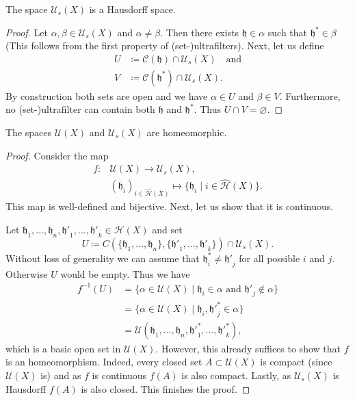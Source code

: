 \begin{lemma}
  The space \(\mathcal{U}_s(X)\) is a Hausdorff space.
\end{lemma}

\begin{proof}
  Let \(\alpha, \beta \in \mathcal{U}_s(X)\) and \(\alpha \neq \beta\). Then there exists \(\mathfrak{h} \in \alpha\) such that \(\mathfrak{h}^\ast \in \beta\) (This follows from the first property of (set-)ultrafilters). Next, let us define
  \begin{align*}
    U & \coloneqq \mathcal{C}(\mathfrak{h}) \cap \mathcal{U}_s(X)\quad \text{and}\\
    V & \coloneqq \mathcal{C}(\mathfrak{h}^\ast) \cap \mathcal{U}_s(X).
  \end{align*}
  By construction both sets are open and we have \(\alpha \in U\) and \(\beta \in V\). Furthermore, no (set-)ultrafilter can contain both \(\mathfrak{h}\) and \(\mathfrak{h}^\ast\). Thus \(U \cap V = \varnothing\). 
\end{proof}

\begin{thm}
  \label{thm:uf-equivalence}
  The spaces \(\mathcal{U}(X)\) and \(\mathcal{U}_s(X)\) are homeomorphic.
\end{thm}

\begin{proof}
  Consider the map
  \begin{align*}
    f\colon &\mathcal{U}(X) \to \mathcal{U}_s(X),\\
    &(\mathfrak{h}_i)_{i \in \mathcal{\hat H}(X)} \mapsto \{\mathfrak{h}_i \mid i \in \mathcal{\hat H}(X)\}.
  \end{align*}
  This map is well-defined and bijective. Next, let us show that it is continuous.

  Let \(\mathfrak{h}_1, \dots, \mathfrak{h}_n, \mathfrak{h'}_1, \dots,\mathfrak{h'}_k \in \mathcal{H}(X)\) and set
  \[
    U \coloneqq C(\{\mathfrak{h}_1, \dots, \mathfrak{h}_n\}, \{\mathfrak{h'}_1, \dots, \mathfrak{h'}_k\}) \cap \mathcal{U}_s(X).
  \]
  Without loss of generality we can assume that \(\mathfrak{h}^\ast_i \neq \mathfrak{h'}_j\) for all possible \(i\) and \(j\). Otherwise \(U\) would be empty. Thus we have
  \begin{align*}
    f^{-1}(U)
    & = \{\alpha \in \mathcal{U}(X) \mid \mathfrak{h}_i \in \alpha \text{ and } \mathfrak{h'}_j \notin \alpha\}\\
    & = \{\alpha \in \mathcal{U}(X) \mid \mathfrak{h}_i, \mathfrak{h'}^\ast_j \in \alpha\}\\
    & = \mathcal{U}(\mathfrak{h}_1, \dots, \mathfrak{h}_n, \mathfrak{h'}^\ast_1, \dots, \mathfrak{h'}^\ast_k),
  \end{align*}
  which is a basic open set in \(\mathcal{U}(X)\). However, this already suffices to show that \(f\) is an homeomorphism. Indeed, every closed set \(A \subset \mathcal{U}(X)\) is compact (since \(\mathcal{U}(X)\) is) and as \(f\) is continuous \(f(A)\) is also compact. Lastly, as \(\mathcal{U}_s(X)\) is Hausdorff \(f(A)\) is also closed. This finishes the proof.
\end{proof}

